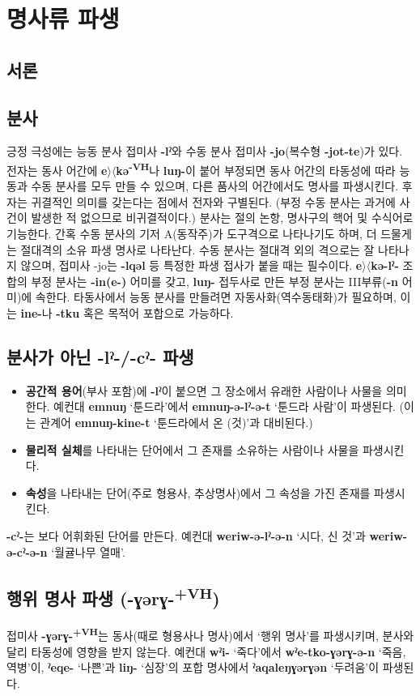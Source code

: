 \section{명사류 파생}
\subsection{서론}
\omission
\subsection{분사}
긍정 극성에는 능동 분사 접미사 \textbf{-lˀ}와 수동 분사 접미사 \textbf{-jo}(복수형 \textbf{-jot-te})가 있다. 전자는 동사 어간에 \textbf{e$\rangle\langle$kə\textsuperscript{-VH}}나 \textbf{luŋ-}이 붙어 부정되면 동사 어간의 타동성에 따라 능동과 수동 분사를 모두 만들 수 있으며, 다른 품사의 어간에서도 명사를 파생시킨다. 후자는 귀결적인 의미를 갖는다는 점에서 전자와 구별된다. (부정 수동 분사는 과거에 사건이 발생한 적 없으므로 비귀결적이다.) 분사는 절의 논항, 명사구의 핵어 및 수식어로 기능한다. 간혹 수동 분사의 기저 A(동작주)가 도구격으로 나타나기도 하며, 더 드물게는 절대격의 소유 파생 명사로 나타난다. 수동 분사는 절대격 외의 격으로는 잘 나타나지 않으며, 접미사 -jo는 \textbf{-lqəl} 등 특정한 파생 접사가 붙을 때는 필수이다. \textbf{e$\rangle\langle$kə-lˀ-} 조합의 부정 분사는 \textbf{-in(e-)} 어미를 갖고, \textbf{luŋ-} 접두사로 만든 부정 분사는 III부류(\textbf{-n} 어미)에 속한다. 타동사에서 능동 분사를 만들려면 자동사화(역수동태화)가 필요하며, 이는 \textbf{ine-}나 \textbf{-tku} 혹은 목적어 포합으로 가능하다.
\subsection{분사가 아닌 -lˀ-/-cˀ- 파생}
\begin{itemize}
	\item \textbf{공간적 용어}(부사 포함)에 \textbf{-lˀ}이 붙으면 그 장소에서 유래한 사람이나 사물을 의미한다. 예컨대 \textbf{emnuŋ} `툰드라'에서 \textbf{emnuŋ-ə-lˀ-ə-t} `툰드라 사람'이 파생된다. (이는 관계어 \textbf{emnuŋ-kine-t} `툰드라에서 온 (것)'과 대비된다.)
	\item \textbf{물리적 실체}를 나타내는 단어에서 그 존재를 소유하는 사람이나 사물을 파생시킨다.
	\item \textbf{속성}을 나타내는 단어(주로 형용사, 추상명사)에서 그 속성을 가진 존재를 파생시킨다.
\end{itemize}
\textbf{-cˀ-}는 보다 어휘화된 단어를 만든다. 예컨대 \textbf{weriw-ə-lˀ-ə-n} `시다, 신 것'과 \textbf{weriw-ə-cˀ-ə-n} `월귤나무 열매'.
\subsection{행위 명사 파생 (-ɣərɣ-\textsuperscript{+VH})}
접미사 \textbf{-ɣərɣ-\textsuperscript{+VH}}는 동사(때로 형용사나 명사)에서 `행위 명사'를 파생시키며, 분사와 달리 타동성에 영향을 받지 않는다. 예컨대 \textbf{wˀi-} `죽다'에서 \textbf{wˀe-tko-ɣərɣ-ə-n} `죽음, 역병'이, \textbf{ˀeqe-} `나쁜'과 \textbf{liŋ-} `심장'의 포합 명사에서 \textbf{ˀaqaleŋɣərɣən} `두려움'이 파생된다.
